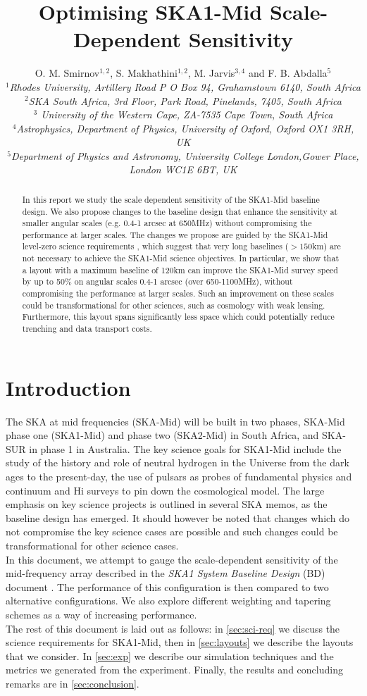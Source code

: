 \documentclass[sfheadings,a4paper,times,9pt,floats,floatfix]{article}
\title{Optimising SKA1-Mid Scale-Dependent Sensitivity}
\author{O. M. Smirnov$^{1,2}$, S. Makhathini$^{1,2}$, M. Jarvis$^{3,4}$ and F. B. Abdalla$^5$ \\{\footnotesize \it $^1$Rhodes
University, Artillery Road P O Box 94, Grahamstown 6140, South Africa} \\{ \footnotesize \it $^2$SKA South Africa, 3rd Floor,
Park Road, Pinelands, 7405, South Africa} \\{\footnotesize \it $^3$ University of the Western Cape, ZA-7535 Cape Town, South
Africa}\\ {\footnotesize \it $^4$Astrophysics, Department of Physics, University of Oxford, Oxford OX1 3RH, UK} \\ {\footnotesize \it $^5$Department of Physics
and Astronomy, University College London,Gower Place, London WC1E 6BT, UK}}
\begin{document}
\maketitle
\begin{abstract}
In this report we study the scale dependent sensitivity of the SKA1-Mid baseline design. We also propose changes to the baseline
design that enhance the sensitivity at smaller angular scales (e.g. 0.4-1 arcsec at 650MHz) without compromising the performance
at larger scales. The changes we propose are guided by the SKA1-Mid level-zero science requirements \cite{srd}, which suggest that
very long baselines ($>150$km) are not necessary to achieve the SKA1-Mid science objectives. In particular, we show that a layout
with a maximum baseline of 120km can improve the SKA1-Mid survey speed by up to 50\% on angular scales 0.4-1 arcsec (over
650-1100MHz), without compromising the performance at larger scales. Such an improvement on these scales could be transformational
for other sciences, such as cosmology with weak lensing. Furthermore, this layout spans significantly less space which could
potentially reduce trenching and data transport costs.
\end{abstract}
\section{Introduction}
The SKA at mid frequencies (SKA-Mid) will be built in two phases, SKA-Mid phase one (SKA1-Mid) and phase two (SKA2-Mid)
in South Africa, and SKA-SUR in phase 1 in Australia. The key science goals for SKA1-Mid include the study of the history and role
of neutral hydrogen in the Universe from the dark ages to the present-day, the use of pulsars as probes of fundamental physics
\cite{bd} and continuum and H{\sc i} surveys to pin down the cosmological model. The large emphasis on key science
projects is outlined in several SKA memos, as the baseline design has emerged. It should however be noted that changes which do not
compromise the key science cases are possible and such changes could be transformational for other science 
cases. \\ In this document, we attempt to gauge the scale-dependent sensitivity of the mid-frequency array
described in the {\it SKA1 System Baseline Design} (BD) document \cite{bd}. The performance of this configuration is then compared
to two alternative configurations. We also explore different weighting and tapering schemes as a way of increasing performance.\\
The rest of this document is laid out as follows: in \autoref{sec:sci-req} we discuss the science requirements for SKA1-Mid, then
in \autoref{sec:layouts} we describe the layouts that we consider. In \autoref{sec:exp} we describe our simulation
techniques and the metrics we generated from the experiment. Finally, the results and concluding remarks are in
\autoref{sec:conclusion}.
\end{document}
